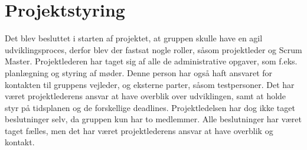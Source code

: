 \section{Projektstyring}

Det blev besluttet i starten af projektet, at gruppen skulle have en agil udviklingsproces, derfor blev der fastsat nogle roller, såsom projektleder og Scrum Master. Projektlederen har taget sig af alle de administrative opgaver, som f.eks. planlægning og styring af møder. Denne person har også haft ansvaret for kontakten til gruppens vejleder, og eksterne parter, såsom testpersoner. Det har været projektlederens ansvar at have overblik over udviklingen, samt at holde styr på tidsplanen og de forskellige deadlines. Projektledelsen har dog ikke taget beslutninger selv, da gruppen kun har to medlemmer. Alle beslutninger har været taget fælles, men det har været projektlederens ansvar at have overblik og kontakt.